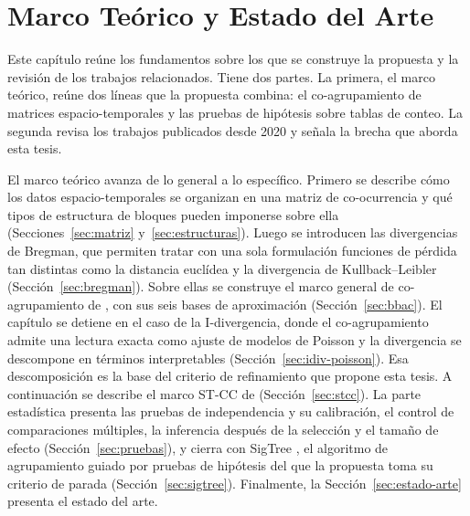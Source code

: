 
\chapter{Marco Teórico y Estado del Arte}\label{chap:marco}

Este capítulo reúne los fundamentos sobre los que se construye la propuesta y la
revisión de los trabajos relacionados. Tiene dos partes. La primera, el marco
teórico, reúne dos líneas que la propuesta combina: el co-agrupamiento de
matrices espacio-temporales y las pruebas de hipótesis sobre tablas de conteo. La
segunda revisa los trabajos publicados desde 2020 y señala la brecha que aborda
esta tesis.

El marco teórico avanza de lo general a lo específico. Primero se describe cómo
los datos espacio-temporales se organizan en una matriz de co-ocurrencia y qué
tipos de estructura de bloques pueden imponerse sobre ella
(Secciones~\ref{sec:matriz} y~\ref{sec:estructuras}). Luego se introducen las
divergencias de Bregman, que permiten tratar con una sola formulación funciones de
pérdida tan distintas como la distancia euclídea y la divergencia de
Kullback--Leibler (Sección~\ref{sec:bregman}). Sobre ellas se construye el marco
general de co-agrupamiento de \cite{Banerjee2007}, con sus seis bases de
aproximación (Sección~\ref{sec:bbac}). El capítulo se detiene en el caso de la
I-divergencia, donde el co-agrupamiento admite una lectura exacta como ajuste de
modelos de Poisson y la divergencia se descompone en términos interpretables
(Sección~\ref{sec:idiv-poisson}). Esa descomposición es la base del criterio de
refinamiento que propone esta tesis. A continuación se describe el marco ST-CC de
\cite{Liu2021} (Sección~\ref{sec:stcc}). La parte estadística presenta las pruebas
de independencia y su calibración, el control de comparaciones múltiples, la
inferencia después de la selección y el tamaño de efecto
(Sección~\ref{sec:pruebas}), y cierra con SigTree \cite{Hu2025}, el algoritmo de
agrupamiento guiado por pruebas de hipótesis del que la propuesta toma su
criterio de parada (Sección~\ref{sec:sigtree}). Finalmente, la
Sección~\ref{sec:estado-arte} presenta el estado del arte.


